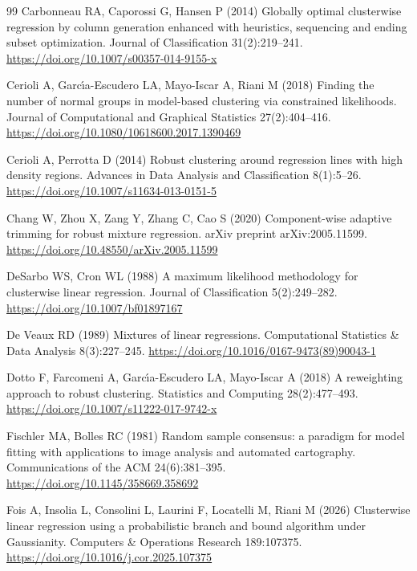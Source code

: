 \begin{thebibliography}{99}
 Carbonneau RA, Caporossi G, Hansen P (2014) Globally optimal clusterwise regression by column generation enhanced with heuristics, sequencing and ending subset optimization. Journal of Classification 31(2):219--241. \url{https://doi.org/10.1007/s00357-014-9155-x}

 Cerioli A, Garc\'{\i}a-Escudero LA, Mayo-Iscar A, Riani M (2018) Finding the number of normal groups in model-based clustering via constrained likelihoods. Journal of Computational and Graphical Statistics 27(2):404--416. \url{https://doi.org/10.1080/10618600.2017.1390469}

 Cerioli A, Perrotta D (2014) Robust clustering around regression lines with high density regions. Advances in Data Analysis and Classification 8(1):5--26. \url{https://doi.org/10.1007/s11634-013-0151-5}

 Chang W, Zhou X, Zang Y, Zhang C, Cao S (2020) Component-wise adaptive trimming for robust mixture regression. arXiv preprint arXiv:2005.11599. \url{https://doi.org/10.48550/arXiv.2005.11599}

 DeSarbo WS, Cron WL (1988) A
maximum likelihood methodology for clusterwise linear regression. Journal of
Classification 5(2):249--282. \url{https://doi.org/10.1007/bf01897167}

 De Veaux RD (1989) Mixtures of linear regressions. Computational Statistics \& Data Analysis 8(3):227--245. \url{https://doi.org/10.1016/0167-9473(89)90043-1}

 Dotto F, Farcomeni A, Garc\'{\i}a-Escudero LA, Mayo-Iscar A (2018) A reweighting approach to robust
clustering. Statistics and Computing 28(2):477--493. \url{https://doi.org/10.1007/s11222-017-9742-x}

 Fischler MA, Bolles RC (1981) Random sample consensus: a paradigm for model fitting with applications to image analysis and automated cartography. Communications of the ACM 24(6):381--395. \url{https://doi.org/10.1145/358669.358692}

 Fois A, Insolia L, Consolini L, Laurini F, Locatelli M, Riani M (2026) Clusterwise linear regression using a probabilistic branch and bound algorithm under Gaussianity. Computers \& Operations Research 189:107375. \url{https://doi.org/10.1016/j.cor.2025.107375}


\end{thebibliography}
